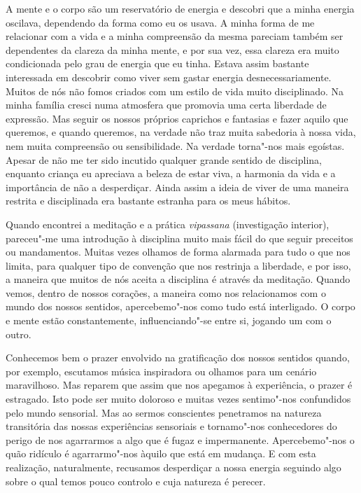 A mente e o corpo são um reservatório de energia e descobri que a minha
energia oscilava, dependendo da forma como eu os usava. A minha forma de
me relacionar com a vida e a minha compreensão da mesma pareciam também
ser dependentes da clareza da minha mente, e por sua vez, essa clareza
era muito condicionada pelo grau de energia que eu tinha. Estava assim
bastante interessada em descobrir como viver sem gastar energia
desnecessariamente. Muitos de nós não fomos criados com um estilo de
vida muito disciplinado. Na minha família cresci numa atmosfera que
promovia uma certa liberdade de expressão. Mas seguir os nossos próprios
caprichos e fantasias e fazer aquilo que queremos, e quando queremos, na
verdade não traz muita sabedoria à nossa vida, nem muita compreensão ou
sensibilidade. Na verdade torna"-nos mais egoístas. Apesar de não me ter
sido incutido qualquer grande sentido de disciplina, enquanto criança eu
apreciava a beleza de estar viva, a harmonia da vida e a importância de
não a desperdiçar. Ainda assim a ideia de viver de uma maneira restrita
e disciplinada era bastante estranha para os meus hábitos.

Quando encontrei a meditação e a prática \emph{vipassana} (investigação
interior), pareceu"-me uma introdução à disciplina muito mais fácil do
que seguir preceitos ou mandamentos. Muitas vezes olhamos de forma
alarmada para tudo o que nos limita, para qualquer tipo de convenção que
nos restrinja a liberdade, e por isso, a maneira que muitos de nós
aceita a disciplina é através da meditação. Quando vemos, dentro de
nossos corações, a maneira como nos relacionamos com o mundo dos nossos
sentidos, apercebemo"-nos como tudo está interligado. O corpo e mente
estão constantemente, influenciando"-se entre si, jogando um com o outro.

Conhecemos bem o prazer envolvido na gratificação dos nossos sentidos
quando, por exemplo, escutamos música inspiradora ou olhamos para um
cenário maravilhoso. Mas reparem que assim que nos apegamos à
experiência, o prazer é estragado. Isto pode ser muito doloroso e muitas
vezes sentimo"-nos confundidos pelo mundo sensorial. Mas ao sermos
conscientes penetramos na natureza transitória das nossas experiências
sensoriais e tornamo"-nos conhecedores do perigo de nos agarrarmos a algo
que é fugaz e impermanente. Apercebemo"-nos o quão ridículo é
agarrarmo"-nos àquilo que está em mudança. E com esta realização,
naturalmente, recusamos desperdiçar a nossa energia seguindo algo sobre
o qual temos pouco controlo e cuja natureza é perecer.

